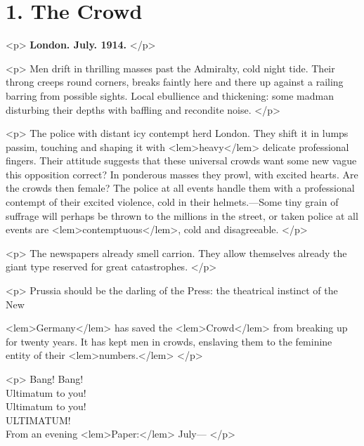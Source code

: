 
\beginnumbering
	\section*{1. The Crowd}

				<p>
\textbf{London. July. 1914.}
				</p>

				\bigskip
				<p>
					Men drift in thrilling masses past the Admiralty, cold night tide. Their throng 
					creeps round corners, breaks faintly here and there up against a railing barring 
					from possible sights. Local ebullience and thickening: some madman disturbing their 
					depths with baffling and recondite noise. 
				</p>

				<p>
					The police with distant icy contempt herd London. They shift it in lumps passim, 
					touching and shaping it with 
<lem>heavy</lem>
						{} 
					delicate professional fingers. Their attitude 
					suggests that these universal crowds want some new vague 
						{} 
					this opposition correct? In ponderous masses they prowl, with excited hearts. 
					Are the crowds then female? The police at all events handle them with a professional 
					contempt of their excited violence, cold in their helmets.---Some tiny grain of 
					suffrage will perhaps be thrown to the millions in the street, or taken 
						{} 
						police at all events are 
<lem>contemptuous</lem>{}, cold and disagreeable. 
				</p>

				<p>
					The newspapers already smell carrion. They allow themselves already the giant type 
					reserved for great catastrophes.  
				</p>

				<p>
					Prussia should be the darling of the Press: the theatrical instinct of the New 
					
<lem>Germany</lem>
						{} 
					has saved the 
<lem>Crowd</lem>
						{} 
					from breaking up for twenty years. It has kept men in 
					crowds, enslaving them to the feminine entity of their 
<lem>numbers.</lem>
						{}
 				</p>
				
				\medskip
				<p>
					\noindent Bang! Bang!\\
					Ultimatum to you!\\
					Ultimatum to you!\\
					ULTIMATUM!\\
					From an evening 
<lem>Paper:</lem>
						{} 
					July--- 
				</p>


